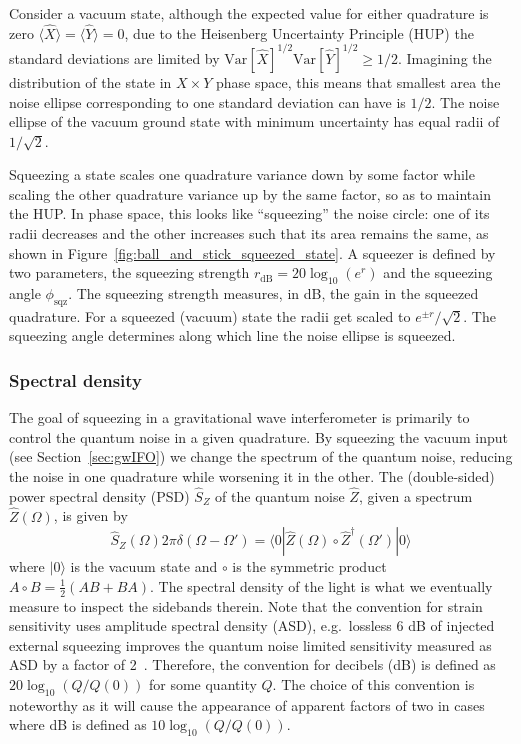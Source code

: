 \documentclass[aps,pra,superscriptaddress,reprint,nofootinbib]{revtex4-1}
\begin{document}
Consider a vacuum state, although the expected value for either quadrature is zero $\langle \hat{X} \rangle = \langle \hat{Y} \rangle = 0$, due to the Heisenberg Uncertainty Principle (HUP) the standard deviations are limited by $\mathrm{Var}[\hat{X}]^{1/2} \mathrm{Var}[\hat{Y}]^{1/2} \geq 1/2$. Imagining the distribution of the state in $X \times Y$ phase space, this means that smallest area the noise ellipse corresponding to one standard deviation can have is $1/2$. The noise ellipse of the vacuum ground state with minimum uncertainty has equal radii of $1/\sqrt{2}$.


Squeezing a state scales one quadrature variance down by some factor while scaling the other quadrature variance up by the same factor, so as to maintain the HUP. In phase space, this looks like “squeezing” the noise circle: one of its radii decreases and the other increases such that its area remains the same, as shown in Figure~\ref{fig:ball_and_stick_squeezed_state}. A squeezer is defined by two parameters, the squeezing strength $r_{\mathrm{dB}} = 20 \log_{10}(e^r)$ and the squeezing angle $\phi_{\mathrm{sqz}}$. The squeezing strength measures, in dB, the gain in the squeezed quadrature. For a squeezed (vacuum) state the radii get scaled to $e^{\pm r}/\sqrt{2}$. The squeezing angle determines along which line the noise ellipse is squeezed.

\subsubsection{Spectral density}

The goal of squeezing in a gravitational wave interferometer is primarily to control the quantum noise in a given quadrature. By squeezing the vacuum input (see Section~\ref{sec:gwIFO}) we change the spectrum of the quantum noise, reducing the noise in one quadrature while worsening it in the other. The (double-sided) power spectral density (PSD) $\hat{S}_Z$ of the quantum noise $\hat{Z}$, given a spectrum $\hat{Z}(\Omega)$, is given by
\begin{equation}
\hat{S}_Z(\Omega) 2 \pi \delta(\Omega - \Omega') = \langle0| \hat{Z}(\Omega) \circ \hat{Z}^\dagger(\Omega') |0\rangle
\end{equation}
where $|0\rangle$ is the vacuum state and $\circ$ is the symmetric product $A \circ B = \frac{1}{2}(A B + B A)$.
The spectral density of the light is what we eventually measure to inspect the sidebands therein.
Note that the convention for strain sensitivity uses amplitude spectral density (ASD), e.g.\ lossless 6 dB of injected external squeezing improves the quantum noise limited sensitivity measured as ASD by a factor of 2~\cite{Aasi_2013}.
Therefore, the convention for decibels (dB) is defined as $20 \log_{10}(Q/{Q(0)})$ for some quantity $Q$. The choice of this convention is noteworthy as it will cause the appearance of apparent factors of two in cases where dB is defined as $10 \log_{10}(Q/{Q(0)})$.
\end{document}
